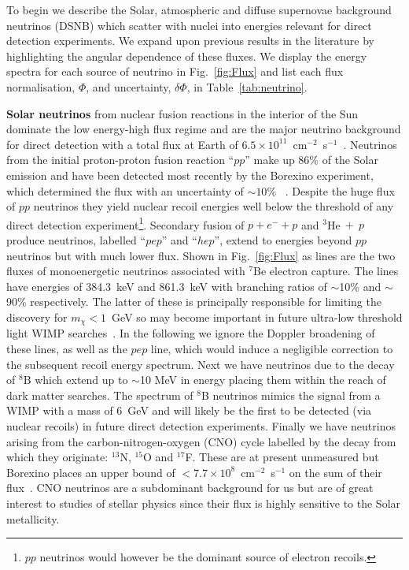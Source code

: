 To begin we describe the Solar, atmospheric and diffuse supernovae background neutrinos (DSNB) which scatter with nuclei into energies relevant for direct detection experiments. We expand upon previous results in the literature by highlighting the angular dependence of these fluxes. We display the energy spectra for each source of neutrino in Fig.~\ref{fig:Flux} and list each flux normalisation, $\Phi$, and uncertainty, $\delta \Phi$, in Table~\ref{tab:neutrino}.

{\bf Solar neutrinos} from nuclear fusion reactions in the interior of the Sun dominate the low energy-high flux regime and are the major neutrino background for direct detection with a total flux at Earth of $6.5\times10^{11}$~cm$^{-2}$~s$^{-1}$~\cite{Robertson:2012ib,Antonelli:2012qu}. Neutrinos from the initial proton-proton fusion reaction ``$pp$'' make up 86\% of the Solar emission and have been detected most recently by the Borexino experiment, which determined the flux with an uncertainty of $\sim 10$\% ~\cite{Bellini:2014uqa}. Despite the huge flux of $pp$ neutrinos they yield nuclear recoil energies well below the threshold of any direct detection experiment\footnote{$pp$ neutrinos would however be the dominant source of electron recoils.}. Secondary fusion of $p+e^-+p$ and $^3 $He$~+~p$ produce neutrinos, labelled ``$pep$'' and ``$hep$'', extend to energies beyond $pp$ neutrinos but with much lower flux. Shown in Fig.~\ref{fig:Flux} as lines are the two fluxes of monoenergetic neutrinos associated with $^7$Be electron capture. The lines have energies of 384.3~keV and 861.3~keV with branching ratios of $\sim$10\% and $\sim$90\% respectively. The latter of these is principally responsible for limiting the discovery for $m_\chi<1$~GeV so may become important in future ultra-low threshold light WIMP searches~\cite{Strigari:2016ztv}. In the following we ignore the Doppler broadening of these lines, as well as the $pep$ line, which would induce a negligible correction to the subsequent recoil energy spectrum. Next we have neutrinos due to the decay of $^8$B which extend up to $\sim$10 MeV in energy placing them within the reach of dark matter searches. The spectrum of $^8$B neutrinos mimics the signal from a WIMP with a mass of 6~GeV and will likely be the first to be detected (via nuclear recoils) in future direct detection experiments. Finally we have neutrinos arising from the carbon-nitrogen-oxygen (CNO) cycle labelled by the decay from which they originate: $^{13}$N, $^{15}$O and $^{17}$F. These are at present unmeasured but Borexino places an upper bound of $<7.7\times10^8$~cm$^{-2}$~s$^{-1}$ on the sum of their flux~\cite{Bellini:2013lnn}. CNO neutrinos are a subdominant background for us but are of great interest to studies of stellar physics since their flux is highly sensitive to the Solar metallicity. 

